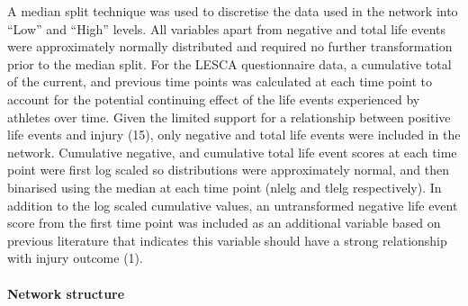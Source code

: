 \documentclass[
  english,
  man]{apa6}
\let\oldparagraph\paragraph
\renewcommand{\paragraph}[1]{\oldparagraph{#1}\mbox{}}
\begin{document}
A median split technique was used to discretise the data used in the network into ``Low'' and ``High'' levels.
All variables apart from negative and total life events were approximately normally distributed and required no further transformation prior to the median split.
For the LESCA questionnaire data, a cumulative total of the current, and previous time points was calculated at each time point to account for the potential continuing effect of the life events experienced by athletes over time.
Given the limited support for a relationship between positive life events and injury (15), only negative and total life events were included in the network.
Cumulative negative, and cumulative total life event scores at each time point were first log scaled so distributions were approximately normal, and then binarised using the median at each time point (nlelg and tlelg respectively).
In addition to the log scaled cumulative values, an untransformed negative life event score from the first time point was included as an additional variable based on previous literature that indicates this variable should have a strong relationship with injury outcome (1).

\hypertarget{network-structure}{%
\paragraph{Network structure}\label{network-structure}}
\end{document}
